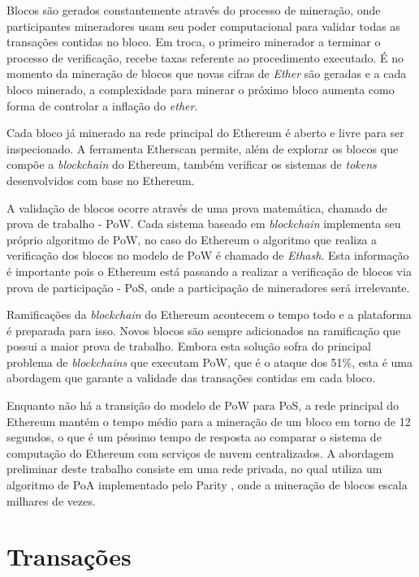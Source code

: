 \documentclass[tcc,capa]{texufpel}
\begin{document}
	Blocos são gerados constantemente através do processo de mineração, onde participantes mineradores usam seu poder computacional para validar todas as transações contidas no bloco. Em troca, o primeiro minerador a terminar o processo de verificação, recebe taxas referente ao procedimento executado. É no momento da mineração de blocos que novas cifras de \textit{Ether} são geradas e a cada bloco minerado, a complexidade para minerar o próximo bloco aumenta como forma de controlar a inflação do \textit{ether}.
	
	Cada bloco já minerado na rede principal do Ethereum é aberto e livre para ser inspecionado. A ferramenta Etherscan \cite{team2017etherscan} permite, além de explorar os blocos que compõe a \textit{blockchain} do Ethereum, também verificar os sistemas de \textit{tokens} desenvolvidos com base no Ethereum.
	
	A validação de blocos ocorre através de uma prova matemática, chamado de prova de trabalho - PoW. Cada sistema baseado em \textit{blockchain} implementa seu próprio algoritmo de PoW, no caso do Ethereum o algoritmo que realiza a verificação dos blocos no modelo de PoW é chamado de \textit{Ethash}. Esta informação é importante pois o Ethereum está passando a realizar a verificação de blocos via prova de participação - PoS, onde a participação de mineradores será irrelevante.
	
	Ramificações da \textit{blockchain} do Ethereum acontecem o tempo todo e a plataforma é preparada para isso. Novos blocos são sempre adicionados na ramificação que possui a maior prova de trabalho. Embora esta solução sofra do principal problema de \textit{blockchains} que executam PoW, que é o ataque dos 51\%, esta é uma abordagem que garante a validade das transações contidas em cada bloco.
	
	Enquanto não há a transição do modelo de PoW para PoS, a rede principal do Ethereum mantém o tempo médio para a mineração de um bloco em torno de 12 segundos, o que é um péssimo tempo de resposta ao comparar o sistema de computação do Ethereum com serviços de nuvem centralizados. A abordagem preliminar deste trabalho consiste em uma rede privada, no qual utiliza um algoritmo de PoA implementado pelo Parity \cite{parity2018wiki}, onde a mineração de blocos escala milhares de vezes.

    
	\section{Transações}\label{ssc:transacoes}
	
\end{document}
